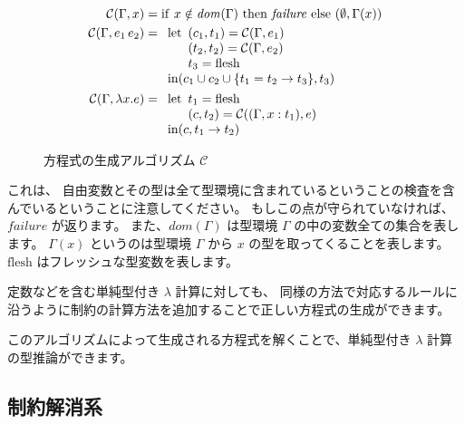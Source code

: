 \begin{figure}[htbp]
 \begin{align*}
  \mathcal{C}(\Gamma, x) &=
   \mathrm{if} ~ x \notin \mathit{dom}(\Gamma) ~
   \mathrm{then} ~ \mathit{failure} ~
   \mathrm{else} ~ (\emptyset, \Gamma(x)) \\
  \mathcal{C}(\Gamma, e_1 \, e_2) &=
  \begin{array}[t]{l}
   \mathrm{let}
    \begin{array}[t]{l}
     (c_1, t_1) = \mathcal{C}(\Gamma, e_1) \\
     (t_2, t_2) = \mathcal{C}(\Gamma, e_2) \\
     t_3 = \mathrm{flesh}
    \end{array} \\
   \mathrm{in} (c_1 \cup c_2 \cup \{t_1 = t_2 \to t_3\}, t_3)
  \end{array} \\
  \mathcal{C}(\Gamma, \lambda x . e) &=
  \begin{array}[t]{l}
   \mathrm{let}
    \begin{array}[t]{l}
     t_1 = \mathrm{flesh} \\
     (c, t_2) = \mathcal{C}((\Gamma, x : t_1), e)
    \end{array} \\
   \mathrm{in} (c, t_1 \to t_2)
  \end{array}
 \end{align*}
 \caption{方程式の生成アルゴリズム $\mathcal C$}
 \label{fig:algorithm-c}
\end{figure}

これは、
自由変数とその型は全て型環境に含まれているということの検査を含んでいるということに注意してください。
もしこの点が守られていなければ、$\mathit{failure}$ が返ります。
また、$\mathit{dom}(\Gamma)$ は型環境 $\Gamma$ の中の変数全ての集合を表します。
$\Gamma(x)$ というのは型環境 $\Gamma$ から $x$ の型を取ってくることを表します。
$\mathrm{flesh}$ はフレッシュな型変数を表します。

定数などを含む単純型付き $\lambda$ 計算に対しても、
同様の方法で対応するルールに沿うように制約の計算方法を追加することで正しい方程式の生成ができます。

このアルゴリズムによって生成される方程式を解くことで、単純型付き $\lambda$ 計算の型推論ができます。

\subsection{制約解消系}

